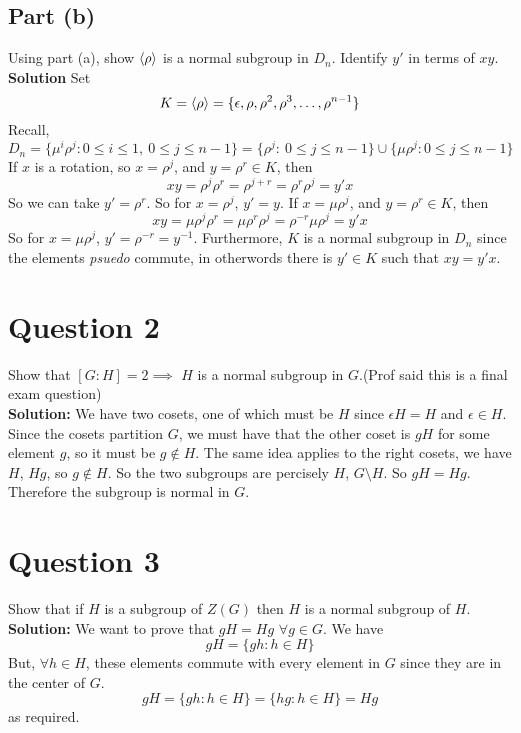 \documentclass[openany]{report}
\begin{document}
\subsection{Part (b)}
Using part (a), show $\langle \rho \rangle$ is a normal subgroup in $D_n$. Identify $y'$ in terms of $xy$. \\[2ex]
\textbf{Solution} Set
\[K = \langle \rho \rangle = \{\epsilon, \rho, \rho^2, \rho^3, \ldots, \rho^{n-1}\}\]
Recall,
\[D_n = \{\mu^i\rho^j: 0 \leq i \leq 1, \ 0 \leq j \leq n - 1\} = \{\rho^j: \ 0 \leq j \leq n - 1\} \cup \{\mu\rho^j: 0 \leq j \leq n-1\}\]
If $x$ is a rotation, so $x = \rho^j$, and $y = \rho^r \in K$, then 
\[xy = \rho^j\rho^r = \rho^{j+r} = \rho^r\rho^j = y'x\]
So we can take $y' = \rho^r$. So for $x = \rho^j$, $y' = y$. If $x = \mu\rho^j$, and $y = \rho^r \in K$, then 
\[xy = \mu\rho^j\rho^r = \mu\rho^r\rho^j = \rho^{-r}\mu\rho^j = y'x\]
So for $x = \mu\rho^j$, $y' = \rho^{-r} = y^{-1}$. Furthermore, $K$ is a normal subgroup in $D_n$ since the elements \emph{psuedo} commute, in otherwords there is $y' \in K$ such that $xy = y'x$.

\section{Question 2}
Show that $[G:H] = 2 \implies$ $H$ is a normal subgroup in $G$.(Prof said this is a final exam question)\\[2ex]
\textbf{Solution:}
We have two cosets, one of which must be $H$ since $\epsilon H = H$ and $\epsilon \in H$. Since the cosets partition $G$, we must have that the other coset is $gH$ for some element $g$, so it must be $g \not\in H$. The same idea applies to the right cosets, we have $H$, $Hg$, so $g \not\in H$. So the two subgroups are percisely $H$, $G \setminus H$. So $gH = Hg$. Therefore the subgroup is normal in $G$. 

\section{Question 3} 
Show that if $H$ is a subgroup of $Z(G)$ then $H$ is a normal subgroup of $H$. \\[2ex]
\textbf{Solution:}
We want to prove that $gH = Hg$ $\forall g \in G$. We have
\[gH = \{gh : h \in H\}\]
But, $\forall h \in H$, these elements commute with every element in $G$ since they are in the center of $G$. 
\[gH = \{gh : h \in H\} = \{hg: h \in H\} = Hg\]
as required.
\end{document}
